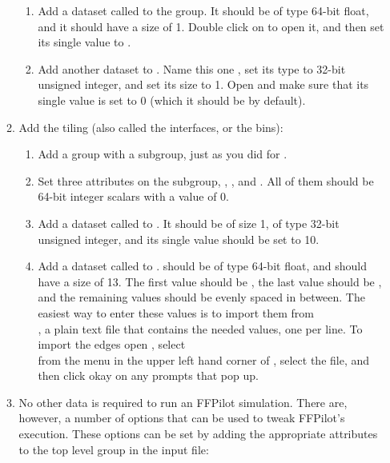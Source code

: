\begin{enumerate}
\begin{enumerate}
\begin{enumerate}
            \item Add a dataset called  to the  group. It should be of type 64-bit float, and it should have a size of 1. Double click on  to open it, and then set its single value to .
            \item Add another dataset to . Name this one , set its type to 32-bit unsigned integer, and set its size to 1. Open  and make sure that its single value is set to 0 (which it should be by default).
        \end{enumerate}
        \item{Add the tiling (also called the interfaces, or the bins):}
        \begin{enumerate}
            \item Add a  group with a  subgroup, just as you did for .
            \item Set three attributes on the  subgroup, , , and . All of them should be 64-bit integer scalars with a value of 0.
            \item Add a dataset called  to . It should be of size 1, of type 32-bit unsigned integer, and its single value should be set to 10.
            \item Add a dataset called  to .  should be of type 64-bit float, and should have a size of 13. The first value should be , the last value should be , and the remaining values should be evenly spaced in between. The easiest way to enter these values is to import them from \\ , a plain text file that contains the needed values, one per line. To import the edges open , select \\  from the  menu in the upper left hand corner of , select the  file, and then click okay on any prompts that pop up.
        \end{enumerate}
        \item No other data is required to run an FFPilot simulation. There are, however, a number of options that can be used to tweak FFPilot's execution. These options can be set by adding the appropriate attributes to the top level  group in the input  file:

\end{enumerate}
\end{enumerate}
